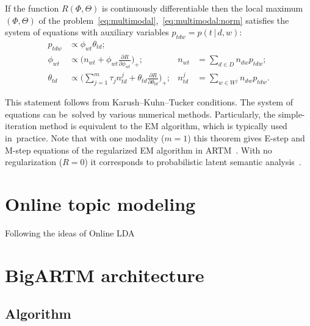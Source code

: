 \documentclass{llncs}
\newcommand{\cond}{\mspace{3mu}{|}\mspace{3mu}}
\begin{document}
\begin{theorem}
\label{th:multimodal}
    If the function $R(\Phi,\Theta)$ is continuously differentiable
    then the local maximum $(\Phi,\Theta)$
    of the problem~\eqref{eq:multimodal},~\eqref{eq:multimodal:norm}
    satisfies the system of equations
    with auxiliary variables $p_{tdw} = p(t\cond d,w)$:
    \begin{align*}
        p_{tdw} &\propto \phi_{wt}\theta_{td};
    \\
        \phi_{wt} &\propto
            \biggl(
                n_{wt} + \phi_{wt} \frac{\partial R}{\partial \phi_{wt}}
            \biggr)_{\!\!+};
        &
        n_{wt} &= \sum_{d\in D} n_{dw} p_{tdw};
    \\
        \theta_{td} &\propto
            \biggl(
                \sum_{j=1}^m \tau_j n^j_{td} + \theta_{td} \frac{\partial R}{\partial \theta_{td}}
            \biggr)_{\!\!+};
        &
        n^j_{td} &= \sum_{w\in W^j} n_{dw} p_{tdw}.
    \end{align*}
\end{theorem}

This statement follows from Karush--Kuhn--Tucker conditions.
The system of equations can be~solved by various numerical methods.
Particularly,
the simple-iteration method is equivalent to the EM algorithm,
which is typically used in~practice.
Note that with one modality (${m=1}$)
this theorem gives E-step and M-step equations of the regularized EM algorithm
in ARTM~\cite{voron14aist,voron14mlj}.
With no regularization (${R=0}$) it corresponds to 
probabilistic latent semantic analysis~\cite{hofmann99plsi}. 

\section{Online topic modeling}
\label{sec:Online}

Following the ideas of Online LDA \cite{hoffman10online}

\section{BigARTM architecture}
\label{sec:BigARTM}

\subsection{Algorithm}
\end{document}
